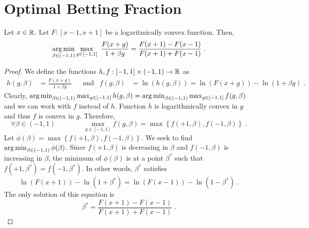 \section{Optimal Betting Fraction}
\label{section:optimal-betting-fraction}

\begin{theorem}
\label{theorem:optimal-betting-fraction}
Let $x \in \mathbb{R}$. Let $F:[x-1,x+1]$ be a logaritmically convex function. Then,
$$
\argmin_{\beta \in (-1,1)} \max_{g \in [-1,1]} \ \frac{F(x+g)}{1 + \beta g}
= \frac{F(x+1) - F(x-1)}{F(x+1) + F(x-1)} \; .
$$
\end{theorem}

\begin{proof}
We define the functions $h,f:[-1,1] \times (-1,1) \to \mathbb{R}$ as
\begin{align*}
h(g, \beta) & = \frac{F(x+g)}{1 + \beta g} &
& \text{and} &
f(g, \beta) & = \ln (h(g,\beta)) = \ln(F(x+g)) - \ln(1 + \beta g) \; .
\end{align*}
Clearly, $\operatorname*{arg\,min}_{\beta \in (-1,1)} \max_{g \in [-1,1]} h(g,\beta) = \operatorname*{arg\,min}_{\beta \in (-1,1)} \max_{g \in [-1,1]} f(g,\beta)$
and we can work with $f$ instead of $h$. Function $h$ is logarithmically convex
in $g$ and thus $f$ is convex in $g$. Therefore,
$$
\forall \beta \in (-1,1) \qquad \qquad
\max_{g \in [-1,1]} f(g,\beta) = \max \left\{ f(+1,\beta), f(-1,\beta) \right\} \; .
$$
Let $\phi(\beta) = \max \left\{ f(+1,\beta), f(-1,\beta) \right\}$. We seek to
find $\operatorname*{arg\,min}_{\beta \in (-1,1)} \phi(\beta)$. Since $f(+1,\beta)$ is decreasing
in $\beta$ and $f(-1,\beta)$ is increasing in $\beta$, the minimum of
$\phi(\beta)$ is at a point $\beta^*$ such that $f(+1,\beta^*) = f(-1,\beta^*)$.
In other words, $\beta^*$ satisfies
$$
\ln(F(x+1)) - \ln(1 + \beta^*) =  \ln(F(x-1)) - \ln(1 - \beta^*) \; .
$$
The only solution of this equation is
$$
\beta^* = \frac{F(x+1) - F(x-1)}{F(x+1) + F(x-1)} \; .
$$
\end{proof}
